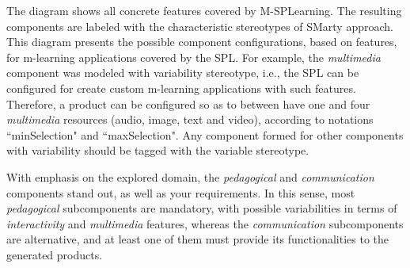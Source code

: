 The diagram shows all concrete features covered by M-SPLearning. The resulting components are labeled with the characteristic stereotypes of SMarty approach. This diagram presents the possible component configurations, based on features, for m-learning applications covered by the SPL.
For example, the \textit{multimedia} component was modeled with variability stereotype, i.e., the SPL can be configured for create custom m-learning applications with such features. Therefore, a product can be configured so as to between have one and four \textit{multimedia} resources (audio, image, text and video), according to notations ``minSelection" and ``maxSelection". Any component formed for other components with variability should be tagged with the variable stereotype.


With emphasis on the explored domain, the \textit{pedagogical} and \textit{communication} components stand out, as well as your requirements. In this sense, most \textit{pedagogical} subcomponents are mandatory, with possible variabilities in terms of \textit{interactivity} and \textit{multimedia} features, whereas the \textit{communication} subcomponents are alternative, and at least one of them must provide its functionalities to the generated products.

